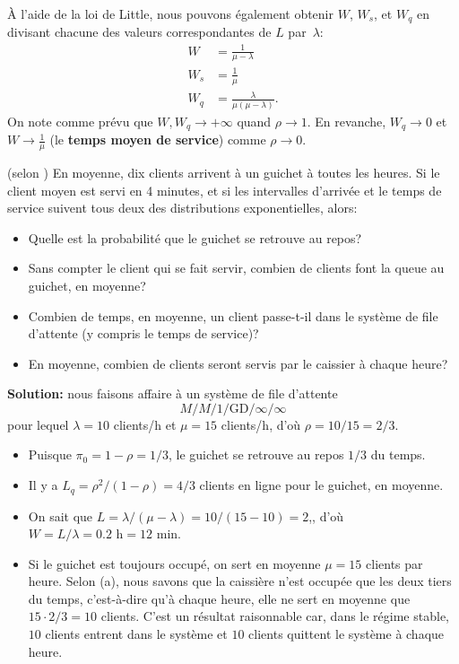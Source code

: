 \`A l'aide de la loi de Little, nous pouvons également obtenir $W$, $W_{s}$, et $W_{q}$ en divisant chacune des valeurs correspondantes de $L$ par~$\lambda$:
\begin{align*}
W &= \frac{1}{\mu - \lambda}\\
W_{s} &= \frac{1}{\mu}\\
W_{q} &= \frac{\lambda}{\mu(\mu-\lambda)}.
 \end{align*}
On note comme prévu que $W,W_q\to +\infty$ quand $\rho\to 1$. En revanche, $W_{q}\to 0$ et $W\to \frac{1}{\mu}$ (le \textbf{temps moyen de service}) comme $\rho\to 0$.
\begin{Exemple} (selon \cite{QS_W}) En moyenne, dix clients arrivent à un guichet \`a toutes les heures. Si le client moyen est servi en 4 minutes, et si les intervalles d'arriv\'ee et le temps de service suivent tous deux des distributions exponentielles, alors: \begin{itemize}[noitemsep]
	\item[(a)] Quelle est la probabilité que le guichet se retrouve au repos? 
	\item[(b)] Sans compter le client qui se fait servir, combien de clients font la queue au guichet, en moyenne? \item[(c)] Combien de temps, en moyenne, un client passe-t-il dans le syst\`eme de file d'attente (y compris le temps de service)?
	\item[(d)] En moyenne, combien de clients seront servis par le caissier \`a chaque heure?
\end{itemize}
\textbf{Solution:} nous faisons affaire \`a un syst\`eme de file d'attente $$M/M/1/\textrm{GD}/\infty/\infty$$ pour lequel $\lambda = 10$ clients/h et $\mu = 15$ clients/h, d'o\`u   $\rho = 10/15 = 2/3$.
\begin{itemize}[noitemsep]
	\item[(a)] Puisque  $\pi_{0} = 1 - \rho = 1/3$, le guichet se retrouve au repos $1/3$ du temps.  
	\item[(b)] Il y a $L_{q} = \rho^{2}/(1-\rho) = 4/3$ clients en ligne pour le guichet, en moyenne. 
	\item[(c)] On sait que $L = \lambda/(\mu - \lambda) = 10/(15-10) = 2$,, d'o\`u  $W = L/\lambda = 0.2 \textrm{ h} = 12 \textrm{ min}$.
	\item[(d)] Si le guichet est toujours occupé, on sert en moyenne $\mu=15$ clients par heure. Selon (a), nous savons que la caissière n'est occupée que les deux tiers du temps, c'est-\`a-dire qu'\`a chaque heure, elle ne sert en moyenne que $15  \cdot 2/3 = 10 $ clients. C'est un résultat raisonnable car, dans le régime stable, $10$ clients entrent dans le syst\`eme  et $10$ clients quittent le syst\`eme \`a chaque heure.
\end{itemize}
\end{Exemple}
